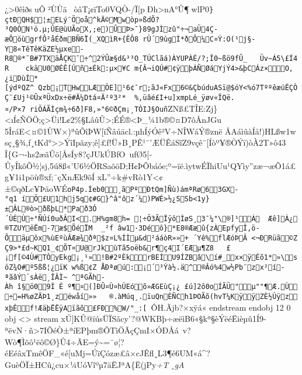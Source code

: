 {¿\textgreater0êìðsuÕ²ÙÙäòâT¡¢ïTo0VQÒ-/Ï{[}pÐh\textgreater nA°Û¶wlP0\texttt{\}çtÐQH\$¦±\textquotesingle{}ELý¨Öoå\^{}kÄ©Mwòp»ßdÕ?³Q0ÓN¹ö.µ;ÛE@ùUÃoX,;e)ÛÞ\textgreater{}¯\}89gJÌzû"÷¬aÜ4Ç­æÔöùgrfÔ²åÉðmBÑ6Ï(\_XQìR+\{ÊÔ8~rÙ´9ùgÌ*ðÔ¼C¤Ý:O(¹j§-Y8«TêTêKäZE½µxe-R8®*¯B\#7TXäÅÇK¯÷\^{}2ÝÛæ§d\&³³O\_TÚC\textbar{}lãá)ÀYUPÀÉ/?;Î0\textasciitilde{}ßö9fÛ\_\ \ \ Üv\textasciitilde{}Á5\textbackslash{}£Í4R\ \ \ \ ckäU0ØÉÊ{[}Úñ±Ék:µ×¥C\ m\{Â¬iQÚ\#¢ÿþÁÑØáYjÝ4\textgreater{}\&þCÁz×O,¿i\textbar{}DùÍ*{[}ýdºQZ\^{}\ Qzb¡THwLÆÒE{]}¹6¢¯r;ãJ«Fx6©\&ÇbúduASï@\$óY\textless{}\%ó7TººêæúËÇÒÇ¨£Uj­¹©ÛxªÜxDx÷ë\#Ä¼Dtá¤Ä²º\textquotesingle{}3²*\ \ \%,üâé£I+u{]}xmpLé\_ÿøv«ÎQë.¤/P×7\ riÖÁÃÌçm¾÷6ð{]}F8,»"6©ðÇm¡¸TÒIJ§Ouñ}ZNß£TÎE:Zj\}\textless{}\iÍ¢ÑÖÖ;ç\textgreater Üi!L¢2\%§LâûÛ\textgreater;ÉÉ®\textless Þ\_\textbar¼1b®©¤D7ôÅnJGu5ÎráE\textless¤©1ÙW×)ªûÕîÞW{[}ïÑâúäcl.:µhÍýÓê²V÷NÎWáÝ®znë
ÅAáìûàÍå!)HLßw1wsç¸§¾,f¸tKd°\textgreater\textgreater ÝîIpãzy;ê{]}£f!Ü»B¸PÊ¹¨'ÆÜÊáSîZ9vçê¨{[}Íòº¥®ÒÝï)òÀ2T»ô43
Î\{G¬-hs2æãÛö{[}­ÅsÍy8?çJUkÚBfO~ufØ5{[}­ÛyÎkôÕ½¦sj,5ú8ß«'U6½ÖRSaõöD;H¢ÞÕbáóe;º=ïë.ìytwÉÏhiUu¹QYìy''zæ¬æÕ1á­£g¥1i1pöù®xf;¯çXnÆk9õÍ
xL''÷k\é\#vRò1Y\textless¢±©qðLc¥ÞäoWÉ\texttt{oP4p.Íeb0¸ãPºÐtQm{]}Ñù)ámªRø63GX-°q1\  íÖ£U1hj5q¢\#G\}\^{}â"ôz´ ¼)PWÉ\textgreater{}½¿SSb­\textless{}1y\}±ÂL®ò\textgreater{}ðßþL*Pað3Ó´Ù\textbar{}ÈÙ÷°ÑÚí0uðÂI\textless{}.H\%gm8h =\ ¦÷Ö3ÃÏÿôÌøS¸3¯¼"\textbackslash{}®{]}¹À\ \ Æê{]}À¿®TZUY\textquotesingle{}ëËm-7æ\$ ÕéÏM\ \ \_²f\ âw1·3Déô\}*E8®Ææû\{zÀEpfyÎ,ö­Õäµôx\%ùEºùÂÆæ¾ðª\$z¤L\%ÍÌµ\&d²ááòR»»+\ ´Yê\%flÆóÞÂ~\textless{}¬Ð\textquotesingle{}Rüã©ZÇ9\textgreater{}*£d\textasciitilde{}KQ1\_¢ÕT¤U@rJkùTã5oëb\&r¶ç4I´EÆµ¶Z8\ \ \ £¡f{[}©4Ù\#TÒyEkg¡¸¹»!B\#2ºÈkrBEÍU9ÍZBâ\textbackslash{}í\#\_x×ÿÈõ1*»\textbackslash{}söZ¾O\#º5ß\textquotesingle{}ß¦¿ïK~w\%ß¢Z\textbar{}\ ÅÐªøú:¡´³Ýà½.ä\^{}®Âó\%4w½Pb¨zx²í-ªãâÝ´sÀë¸ÎÂÌ\textasciitilde{}~\^{}ªGÃh­Àh\ î§ö09Í\ É\ º¶¤({]}ÐÛ¤Ù¤hÚEóõ»ÆGEùÇ¡¿\ £ú{]}2ô0oÍÃÜ"µ""¶Æ.Ù÷=H\%øZÄÞ1¸zéwåí»»\ \ \ ®.àMúq¸.ïuQnÈÑCh1\textquotesingle{}ÞOÃõ(hvT¼KÿÿZÈ½ÙÿzxþÊf!ÆäþËËÿAïãõ£FÐ\%W/"\_:{[}~}ÔH.Ãjb?×xÿá«
endstream endobj 12 0 obj \textless{}\textgreater{} stream
xÚ{]}KÛ@ïúsÜÏSãcy'?@WKBþ÷æëìB6«§kª§èÝëéËièµû1Í9-ªëvN·ñ\textgreater7IÕéÒ±ªíEPþm®ÕTìÖÃçÇmI×ÓÐÅá~v?Wò¶Ìõô¹ëô©Ø\}Û4÷ÃE=ý\textasciitilde=¯ø\textbar¦?éEéâxTmêÖF\_«é{[}uMj=ÚïÇózæ£â×cJÊfl¸L3¶é6UM«á\^{}?GuèÖÏ±HCû¿cu×¼UóVîºµ7äËJªA\{Ë(jPy\emph{÷T¸ gA
}}
